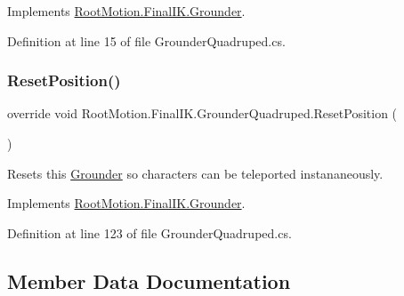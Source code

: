 Implements \mbox{\hyperlink{class_root_motion_1_1_final_i_k_1_1_grounder_af214d235ecea1b81ec637b1b61f756cb}{Root\+Motion.\+Final\+I\+K.\+Grounder}}.



Definition at line 15 of file Grounder\+Quadruped.\+cs.

\mbox{\label{class_root_motion_1_1_final_i_k_1_1_grounder_quadruped_a05edde8488de6e2564d75302724dbda7}} 
\subsubsection{\texorpdfstring{Reset\+Position()}{ResetPosition()}}
{\footnotesize\ttfamily override void Root\+Motion.\+Final\+I\+K.\+Grounder\+Quadruped.\+Reset\+Position (\begin{DoxyParamCaption}{ }\end{DoxyParamCaption})\hspace{0.3cm}{\ttfamily [virtual]}}



Resets this \mbox{\hyperlink{class_root_motion_1_1_final_i_k_1_1_grounder}{Grounder}} so characters can be teleported instananeously. 



Implements \mbox{\hyperlink{class_root_motion_1_1_final_i_k_1_1_grounder_aecbd8b5addf2948f4d5fcd00a1b03314}{Root\+Motion.\+Final\+I\+K.\+Grounder}}.



Definition at line 123 of file Grounder\+Quadruped.\+cs.



\subsection{Member Data Documentation}
\mbox{\label{class_root_motion_1_1_final_i_k_1_1_grounder_quadruped_ad70def3d5184b754d565595486e05940}} 
